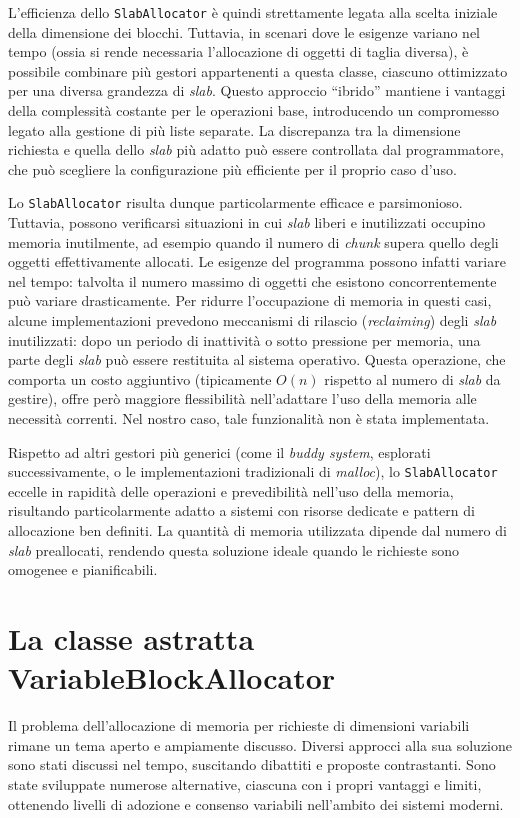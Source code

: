 L’efficienza dello \texttt{SlabAllocator} è quindi strettamente legata alla scelta iniziale della dimensione dei blocchi. Tuttavia, in scenari dove le esigenze variano nel tempo (ossia si rende necessaria l’allocazione di oggetti di taglia diversa), è possibile combinare più gestori appartenenti a questa classe, ciascuno ottimizzato per una diversa grandezza di \textit{slab}. Questo approccio “ibrido” mantiene i vantaggi della complessità costante per le operazioni base, introducendo un compromesso legato alla gestione di più liste separate. La discrepanza tra la dimensione richiesta e quella dello \textit{slab} più adatto può essere controllata dal programmatore, che può scegliere la configurazione più efficiente per il proprio caso d’uso.

Lo \texttt{SlabAllocator} risulta dunque particolarmente efficace e parsimonioso. Tuttavia, possono verificarsi situazioni in cui \textit{slab} liberi e inutilizzati occupino memoria inutilmente, ad esempio quando il numero di \textit{chunk} supera quello degli oggetti effettivamente allocati. Le esigenze del programma possono infatti variare nel tempo: talvolta il numero massimo di oggetti che esistono concorrentemente può variare drasticamente. Per ridurre l’occupazione di memoria in questi casi, alcune implementazioni prevedono meccanismi di rilascio (\textit{reclaiming}) degli \textit{slab} inutilizzati: dopo un periodo di inattività o sotto pressione per memoria, una parte degli \textit{slab} può essere restituita al sistema operativo. Questa operazione, che comporta un costo aggiuntivo (tipicamente $O(n)$ rispetto al numero di \textit{slab} da gestire), offre però maggiore flessibilità nell’adattare l’uso della memoria alle necessità correnti. Nel nostro caso, tale funzionalità non è stata implementata.

Rispetto ad altri gestori più generici (come il \textit{buddy system}, esplorati successivamente, o le implementazioni tradizionali di \textit{malloc}), lo \texttt{SlabAllocator} eccelle in rapidità delle operazioni e prevedibilità nell’uso della memoria, risultando particolarmente adatto a sistemi con risorse dedicate e pattern di allocazione ben definiti. La quantità di memoria utilizzata dipende dal numero di \textit{slab} preallocati, rendendo questa soluzione ideale quando le richieste sono omogenee e pianificabili.

\section{La classe astratta VariableBlockAllocator}
Il problema dell’allocazione di memoria per richieste di dimensioni variabili rimane un tema aperto e ampiamente discusso. Diversi approcci alla sua soluzione sono stati discussi nel tempo, suscitando dibattiti e proposte contrastanti. Sono state sviluppate numerose alternative, ciascuna con i propri vantaggi e limiti, ottenendo livelli di adozione e consenso variabili nell'ambito dei sistemi moderni.

